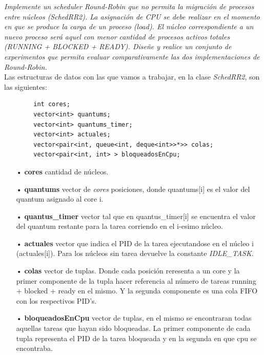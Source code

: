 \documentclass[a4paper]{article}
\begin{document}
 
\textit{Implemente un scheduler Round-Robin que no permita la migraci\'on de procesos entre n\'ucleos (SchedRR2). La asignaci\'on de CPU se debe realizar en el momento en que se produce la carga de un proceso (load). El n\'ucleo correspondiente a un nuevo proceso ser\'a aquel con menor cantidad de procesos activos totales (RUNNING + BLOCKED + READY). Dise\~ne y realice un conjunto de experimentos que permita evaluar comparativamente las dos implementaciones de Round-Robin.}\\


Las estructuras de datos con las que vamos a trabajar, en la clase \emph{SchedRR2}, son las siguientes:


	\begin{codesnippet}
	\begin{verbatim}
		int cores;
		vector<int> quantums;
		vector<int> quantums_timer;
		vector<int> actuales;
		vector<pair<int, queue<int, deque<int>>*>> colas;
		vector<pair<int, int> > bloqueadosEnCpu;
	\end{verbatim}
	\end{codesnippet}
	
	\begin{itemize}
	\item[•]\textbf{cores} cantidad de n\'ucleos.
	\item[•]\textbf{quantums} vector de \emph{cores} posiciones, donde quantums[i] es el valor del quantum asignado al core i.
	\item[•]\textbf{quantus_timer}  vector tal que en quantus_timer[i] se encuentra el valor del quantum restante para la tarea corriendo en el i-esimo núcleo.
	\item[•]\textbf{actuales} vector que indica el PID de la tarea ejecutandose en el núcleo i (actuales[i]). Para los núcleos sin tarea devuelve la constante \textit{IDLE\_TASK}.

	\item[•]\textbf{colas} vector de tuplas. Donde cada posición reresenta a un core y la primer componente de la tupla hacer referencia al número de tareas running + blocked + ready en el mismo. Y la segunda componente es una cola FIFO con los respectivos PID's.  
	\item[•]\textbf{bloqueadosEnCpu} vector de tuplas, en el mismo se encontraran todas aquellas tareas que hayan sido bloqueadas. La primer componente de cada tupla representa el PID de la tarea bloqueada y en la segunda en que cpu se encontraba.


	\end{itemize}	
	
\end{document}
